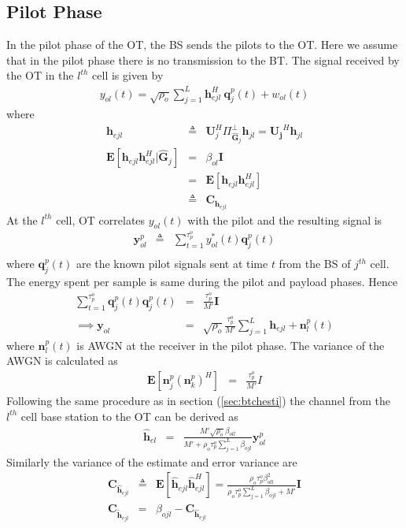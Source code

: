 \documentclass[10pt, a4paper, twoside,fleqn]{article}
\begin{document}
\subsection{Pilot Phase}
	In the pilot phase of the OT, the BS sends the pilots to the OT. Here we assume that in the pilot phase there is no transmission to the BT.
The signal received by the OT in the $l^{th}$ cell is given by
\begin{eqnarray}
	y_{ol}(t)=\sqrt{\rho_o} \sum_{j=1}^{L} \pmb{h}^H_{ejl} \ \pmb{q}^p_{j}(t) + w_{ol}(t) 
\end{eqnarray}
where
\begin{eqnarray}
	\pmb{h}_{ejl} &\triangleq& \pmb{U}_j^H\Pi^{\perp}_{{\widehat{\pmb{G}}_j}}\pmb{h}_{jl} = \pmb{U_j}^H\pmb{h}_{jl} \nonumber \\
    \pmb{E}[\pmb{h}_{ejl}\pmb{h}^H_{ejl}|\pmb{\hat G}_j] &=& \beta_{ol}\pmb{I} \nonumber \\
			                     &=& \pmb{E}[\pmb{h}_{ejl}\pmb{h}^H_{ejl}] \nonumber \\
                                           &\triangleq& \pmb{C}_{\pmb{h}_{ejl}} \nonumber
\end{eqnarray}
At the $l^{th}$ cell, OT correlates $y_{ol}(t)$ with the pilot and the resulting signal is
\begin{eqnarray}
	\pmb{y}_{ol}^{p} &\triangleq& \sum_{t=1}^{\tau_p^o} y_{ol}^*(t)\pmb{q}^{p}_{j}(t) \nonumber \\
\end{eqnarray}
where $\pmb{q}_j^p(t)$ are the known pilot signals sent at time $t$ from the BS of $j^{th}$ cell. The energy spent per sample is same during the pilot and payload phases. Hence 
\begin{eqnarray}
    \sum\limits_{t=1}^{\tau_p^o}\pmb{q}^p_{j}(t)\pmb{q}^p_{j}(t)&=&\frac{\tau_p^o}{M'}\pmb{I} \\
\implies \pmb{y}_{ol} &=& \sqrt{\rho_o}\frac{\tau_p^o}{M'}\sum_{j=1}^{L}\pmb{h}_{ejl}+\pmb{n}^p_{l}(t)
\end{eqnarray}
where $\pmb{n}^p_{l}(t)$ is AWGN at the receiver in the pilot phase. The variance of the AWGN is calculated as
\begin{eqnarray}
	\pmb{E}[\pmb{n}^p_{j}(\pmb{n}^p_{k})^H] &=& \frac{\tau_p^o}{M'}I \nonumber
\end{eqnarray}
Following the same procedure as in section (\ref{sec:btchesti}) the channel from the $l^{th}$ cell base station to the OT can be derived as 
\begin{eqnarray}\label{eqn:otchesti}
	\pmb{\hat h}_{el} &=& \frac{M'\sqrt{\rho_o}\beta_{oll}}{M'+\rho_o\tau_p^o\sum\limits_{j=1}^{L}\beta_{ojl}}\pmb{y}^p_{ol}
\end{eqnarray}
Similarly the variance of the estimate and error variance are
\begin{eqnarray}
	\pmb{C}_{\pmb{\hat h}_{ejl}} &\triangleq& \pmb{E}[\pmb{\hat h}_{ejl}\pmb{\hat h}^H_{ejl}] = \frac{\rho_o\tau_p^o\beta^2_{oll}}{\rho_o\tau_p^o\sum\limits_{j=1}^{L}\beta_{ojl}+M'}\pmb{I} \\
	\pmb{C}_{\pmb{\widetilde{h}}_{ejl}} &=& \beta_{ojl} - 	\pmb{C}_{\pmb{\hat h}_{ejl}}
\end{eqnarray}
\end{document}
